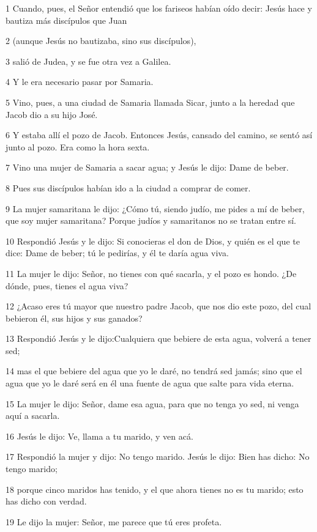 \par 1 Cuando, pues, el Señor entendió que los fariseos habían oído decir: Jesús hace y bautiza más discípulos que Juan
\par 2 (aunque Jesús no bautizaba, sino sus discípulos),
\par 3 salió de Judea, y se fue otra vez a Galilea.
\par 4 Y le era necesario pasar por Samaria.
\par 5 Vino, pues, a una ciudad de Samaria llamada Sicar, junto a la heredad que Jacob dio a su hijo José.
\par 6 Y estaba allí el pozo de Jacob. Entonces Jesús, cansado del camino, se sentó así junto al pozo. Era como la hora sexta.
\par 7 Vino una mujer de Samaria a sacar agua; y Jesús le dijo: Dame de beber.
\par 8 Pues sus discípulos habían ido a la ciudad a comprar de comer.
\par 9 La mujer samaritana le dijo: ¿Cómo tú, siendo judío, me pides a mí de beber, que soy mujer samaritana? Porque judíos y samaritanos no se tratan entre sí.
\par 10 Respondió Jesús y le dijo: Si conocieras el don de Dios, y quién es el que te dice: Dame de beber; tú le pedirías, y él te daría agua viva.
\par 11 La mujer le dijo: Señor, no tienes con qué sacarla, y el pozo es hondo. ¿De dónde, pues, tienes el agua viva?
\par 12 ¿Acaso eres tú mayor que nuestro padre Jacob, que nos dio este pozo, del cual bebieron él, sus hijos y sus ganados?
\par 13 Respondió Jesús y le dijo:Cualquiera que bebiere de esta agua, volverá a tener sed;
\par 14 mas el que bebiere del agua que yo le daré, no tendrá sed jamás; sino que el agua que yo le daré será en él una fuente de agua que salte para vida eterna.
\par 15 La mujer le dijo: Señor, dame esa agua, para que no tenga yo sed, ni venga aquí a sacarla.
\par 16 Jesús le dijo: Ve, llama a tu marido, y ven acá.
\par 17 Respondió la mujer y dijo: No tengo marido. Jesús le dijo: Bien has dicho: No tengo marido;
\par 18 porque cinco maridos has tenido, y el que ahora tienes no es tu marido; esto has dicho con verdad.
\par 19 Le dijo la mujer: Señor, me parece que tú eres profeta.
